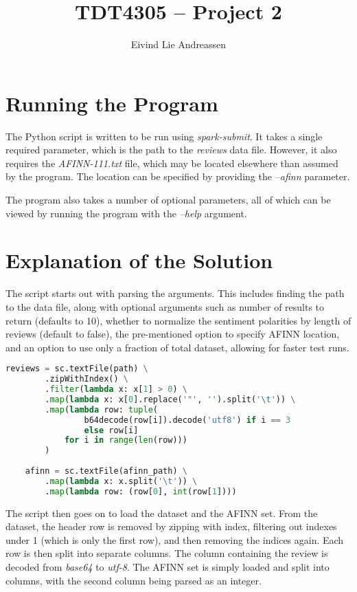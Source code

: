 \documentclass[a4paper]{article}
\title{TDT4305 -- Project 2}
\author{Eivind Lie Andreassen}
\begin{document}
\maketitle

\section{Running the Program}
The Python script is written to be run using \emph{spark-submit}. It takes a single required parameter, which is the path to the \emph{reviews} data file. However, it also requires the \emph{AFINN-111.txt} file, which may be located elsewhere than assumed by the program. The location can be specified by providing the \emph{--afinn} parameter.

The program also takes a number of optional parameters, all of which can be viewed by running the program with the \emph{--help} argument.


\section{Explanation of the Solution}
The script starts out with parsing the arguments. This includes finding the path to the data file, along with optional arguments such as number of results to return (defaults to 10), whether to normalize the sentiment polarities by length of reviews (default to false), the pre-mentioned option to specify AFINN location, and an option to use only a fraction of total dataset, allowing for faster test runs.

\begin{lstlisting}[language=python]
    reviews = sc.textFile(path) \
        .zipWithIndex() \
        .filter(lambda x: x[1] > 0) \
        .map(lambda x: x[0].replace('"', '').split('\t')) \
        .map(lambda row: tuple(
                b64decode(row[i]).decode('utf8') if i == 3 
                else row[i] 
            for i in range(len(row)))
        )
    
    afinn = sc.textFile(afinn_path) \
        .map(lambda x: x.split('\t')) \
        .map(lambda row: (row[0], int(row[1])))
\end{lstlisting}

The script then goes on to load the dataset and the AFINN set. From the dataset, the header row is removed by zipping with index, filtering out indexes under 1 (which is only the first row), and then removing the indices again. Each row is then split into separate columns. The column containing the review is decoded from \emph{base64} to \emph{utf-8}. The AFINN set is simply loaded and split into columns, with the second column being parsed as an integer.
\end{document}
